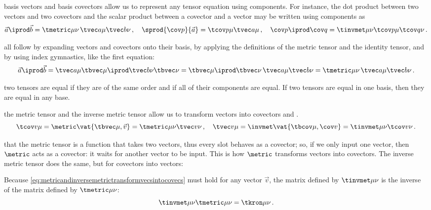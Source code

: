  basis vectors and basis covectors allow us to represent any tensor equation using components. For instance, the dot product between two vectors and two covectors and the scalar product between a covector and a vector may be written using components as
%
\begin{equation}\label{eq:dotproductscalarproductincomponents}
  \vec a\iprod\vec b = \tmetric\mu\nu\,\tvec a\mu\tvec b\nu\,,\quad
  \sprod{\cov p}{\vec a} = \tcov p\mu\tvec a\mu\,,\quad
  \cov p\iprod\cov q = \tinvmet\mu\nu\tcov p\mu\tcov q\nu\,.
\end{equation}

 all follow by expanding vectors and covectors onto their basis, by applying the definitions of the metric tensor and the identity tensor, and by using index gymnastics, like the first equation:
%
\begin{equation*}
  \vec a\iprod\vec b = \tvec a\mu\tbvec\mu\iprod\tvec b\nu\tbvec\nu
                     = \tbvec\mu\iprod\tbvec\nu\,\tvec a\mu\tvec b\nu
                     = \tmetric\mu\nu\,\tvec a\mu\tvec b\nu\,.
\end{equation*}

 two tensors are equal if they are of the same order and if all of their components are equal. If two tensors are equal in one basis, then they are equal in any base.

 the metric tensor and the inverse metric tensor allow us to transform vectors into covectors and \vicvers.
%
\begin{equation}\label{eq:metricandinversemetrictransformvecsintocovecs}
  \tcov v\mu = \metric\vat{\tbvec\mu, \vec v} = \tmetric\mu\nu\tvec v\nu\,,\quad
  \tvec v\mu = \invmet\vat{\tbcov\mu, \cov v} = \tinvmet\mu\nu\tcov v\nu\,.
\end{equation}

 that the metric tensor is a function that takes two vectors, thus every slot behaves as a covector; so, if we only input one vector, then $\metric$ acts as a covector: it waits for another vector to be input. This is how $\metric$ transforms vectors into covectors. The inverse metric tensor does the same, but for covectors into vectors:

Because \cref{eq:metricandinversemetrictransformvecsintocovecs} must hold for any vector $\vec v$, the matrix defined by $\tinvmet\mu\nu$ is the inverse of the matrix defined by $\tmetric\mu\nu$:
%
\begin{equation}\label{eq:metricandinversemetricrelationship}
  \tinvmet\mu\nu\tmetric\mu\nu = \tkron\mu\nu\,.
\end{equation}

